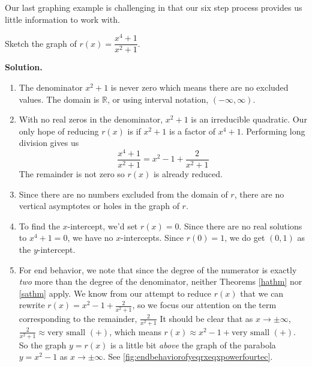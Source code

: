 Our last graphing example is challenging in that our six step process provides us little information to work with.

\begin{ex}   \label{carefulanalysisneeded} Sketch the graph of $r(x) = \dfrac{x^4+1}{x^2+1}$.

{\bf Solution.}

\begin{enumerate}

\item  The denominator $x^2+1$ is never zero which means there are no excluded values.  The domain is $\mathbb{R}$, or using interval notation,  $(-\infty, \infty)$.

\item  With no real zeros in the denominator, $x^2+1$ is an irreducible quadratic.  Our only hope of reducing $r(x)$ is if $x^2+1$ is a factor of $x^4+1$.  Performing long division gives us \[\frac{x^4+1}{x^2+1} = x^2-1+\frac{2}{x^2+1}\] The remainder is not zero so $r(x)$ is already reduced.

\item Since there are no numbers excluded from the domain of $r$, there are no vertical asymptotes or holes in the graph of $r$.

\item  To find the $x$-intercept, we'd set $r(x) = 0$.  Since there are no real solutions to $x^4+1=0$, we have no $x$-intercepts.  Since $r(0) = 1$, we do get $(0,1)$ as the $y$-intercept.

\item  For end behavior, we note that since the degree of the numerator is exactly \textit{two} more than the degree of the denominator, neither Theorems \ref{hathm} nor \ref{sathm} apply. We know from our attempt to reduce $r(x)$ that we can rewrite $r(x) = x^2-1+\frac{2}{x^2+1}$, so we focus our attention on the term corresponding to the remainder, $\frac{2}{x^2+1}$  It should be clear that as $x \rightarrow \pm \infty$, $\frac{2}{x^2+1} \approx \text{very small $(+)$}$, which means $r(x) \approx x^2-1 + \text{very small $(+)$}$.  So the graph $y=r(x)$ is a little bit \textit{above} the graph of the parabola $y=x^2-1$ as $x \rightarrow \pm \infty$. See \autoref{fig:endbehaviorofyeqrxeqxpowerfourtec}.


\end{enumerate}
\end{ex}
